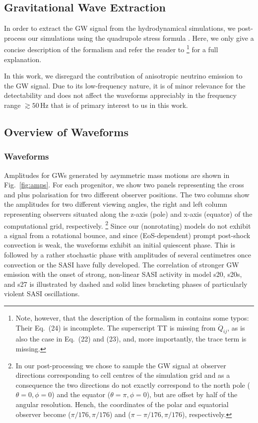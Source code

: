 \subsection{Gravitational Wave Extraction}
In order to extract the GW signal from
the hydrodynamical simulations, we post-process our simulations using
the quadrupole stress formula \citep{finn_89,nakamura_89,blanchet_90}.  Here,
we only give a concise description of the formalism and refer the reader to 
\cite{mueller_e_12}\footnote{Note, however, that the description of the formalism in
\cite{mueller_e_12} contains some typos: Their Eq.~(24) is incomplete. The superscript TT is missing from $\ddot{Q}_{ij}$, as is also the case in Eq.~(22) and (23),
and, more importantly, the trace term is missing.} for a full explanation.

In this work, we disregard the contribution of anisotropic neutrino
emission \citep{epstein_78} to the GW signal. Due
to its low-frequency nature, it is of minor relevance for the
detectability and does not affect the waveforms appreciably
in the frequency range $\gtrsim 50 \, \mathrm{Hz}$ that is of
primary interest to us in this work.

\subsection{Overview of Waveforms}
\subsubsection{Waveforms}
\label{sec:waveforms}
Amplitudes for GWs generated by asymmetric mass motions are shown in
Fig.~\ref{fig:amps}. For each progenitor, we show two panels
representing the cross and plus polarisation for two different
observer positions. The two columns show the amplitudes for two 
different viewing angles, the right and left column representing
observers situated along the z-axis (pole) and x-axis (equator) of the computational grid, respectively.
\footnote{In our post-processing we chose to sample the GW signal at observer directions corresponding to 
cell centres of the simulation grid and as a consequence the two directions do not exactly correspond to the
north pole ($\theta = 0, \phi = 0$) and the equator ($\theta = \pi, \phi = 0$), but are offset by half of the angular resolution.
Hench, the coordinates of the polar and equatorial observer become ($\pi/176,\pi/176$) 
and ($\pi - \pi/176,\pi/176$), respectively.}
Since our (nonrotating) models do not exhibit a signal from a rotational bounce,
and since (EoS-dependent) prompt post-shock convection is weak, 
the waveforms exhibit an initial quiescent phase. This is followed by a rather 
stochastic phase with amplitudes of several centimetres once convection or the SASI have fully developed. 
The correlation of stronger GW emission
with the onset of strong, non-linear SASI activity
in model s20, s20s, and s27 is illustrated
by dashed and solid lines bracketing phases of particularly
violent SASI oscillations.

